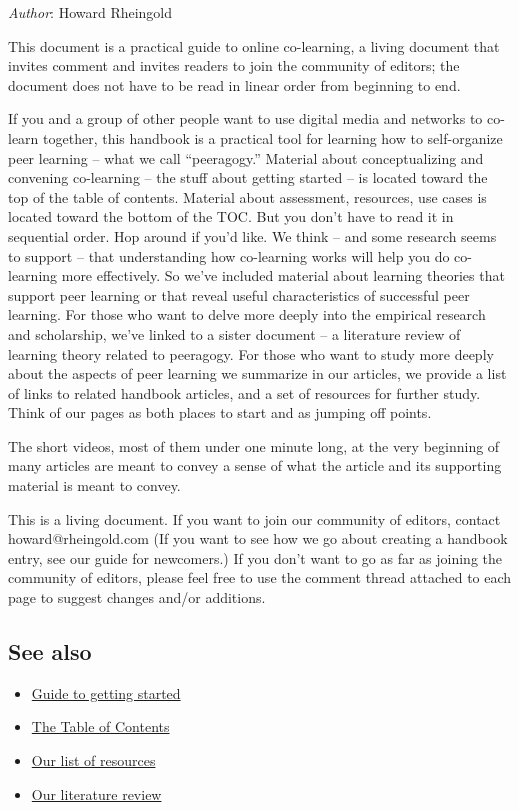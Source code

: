 \emph{Author}: Howard Rheingold

This document is a practical guide to online co-learning, a living
document that invites comment and invites readers to join the community
of editors; the document does not have to be read in linear order from
beginning to end.

If you and a group of other people want to use digital media and
networks to co-learn together, this handbook is a practical tool for
learning how to self-organize peer learning -- what we call
``peeragogy.'' Material about conceptualizing and convening co-learning
-- the stuff about getting started -- is located toward the top of the
table of contents. Material about assessment, resources, use cases is
located toward the bottom of the TOC. But you don't have to read it in
sequential order. Hop around if you'd like. We think -- and some
research seems to support -- that understanding how co-learning works
will help you do co-learning more effectively. So we've included
material about learning theories that support peer learning or that
reveal useful characteristics of successful peer learning. For those who
want to delve more deeply into the empirical research and scholarship,
we've linked to a sister document -- a literature review of learning
theory related to peeragogy. For those who want to study more deeply
about the aspects of peer learning we summarize in our articles, we
provide a list of links to related handbook articles, and a set of
resources for further study. Think of our pages as both places to start
and as jumping off points.

The short videos, most of them under one minute long, at the very
beginning of many articles are meant to convey a sense of what the
article and its supporting material is meant to convey.

This is a living document. If you want to join our community of editors,
contact howard@rheingold.com (If you want to see how we go about
creating a handbook entry, see our guide for newcomers.) If you don't
want to go as far as joining the community of editors, please feel free
to use the comment thread attached to each page to suggest changes
and/or additions.

\subsection{See also}

\begin{itemize}
\item
  \href{http://peeragogy.org/how-to-get-involved/}{Guide to getting
  started}
\item
  \href{http://peeragogy.org/table-of-contents/}{The Table of Contents}
\item
  \href{http://peeragogy.org/resources/}{Our list of resources}
\item
  \href{http://peeragogy.org/resources/literature-review-peeragogy/}{Our
  literature review}
\end{itemize}
